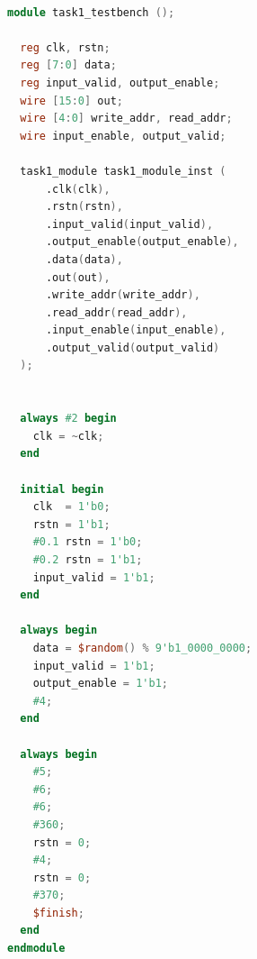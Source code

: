 \documentclass[zihao=5, UTF8]{article}
\theoremstyle{MyLineTheoremStyle} %
\theoremstyle{MyBlockTheoremStyle} %
\theoremstyle{MySubsubsectionStyle} %
\begin{document}
\begin{lstlisting}[language=Verilog]

module task1_testbench ();

  reg clk, rstn;
  reg [7:0] data;
  reg input_valid, output_enable;
  wire [15:0] out;
  wire [4:0] write_addr, read_addr;
  wire input_enable, output_valid;

  task1_module task1_module_inst (
      .clk(clk),
      .rstn(rstn),
      .input_valid(input_valid),
      .output_enable(output_enable),
      .data(data),
      .out(out),
      .write_addr(write_addr),
      .read_addr(read_addr),
      .input_enable(input_enable),
      .output_valid(output_valid)
  );


  always #2 begin
    clk = ~clk;
  end

  initial begin
    clk  = 1'b0;
    rstn = 1'b1;
    #0.1 rstn = 1'b0;
    #0.2 rstn = 1'b1;
    input_valid = 1'b1;
  end

  always begin
    data = $random() % 9'b1_0000_0000;
    input_valid = 1'b1;
    output_enable = 1'b1;
    #4;
  end

  always begin
    #5;
    #6;
    #6;
    #360;
    rstn = 0;
    #4;
    rstn = 0;
    #370;
    $finish;
  end
endmodule

\end{lstlisting}
\end{document}
